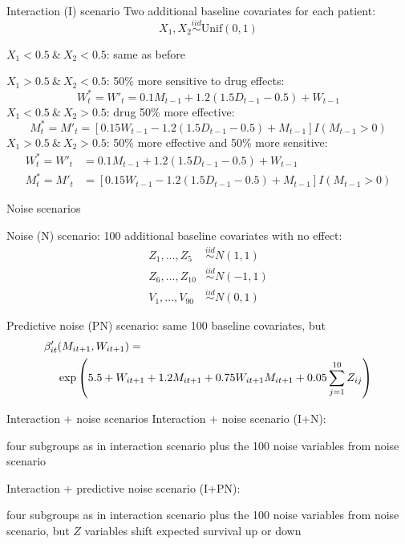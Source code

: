 \documentclass[handout]{beamer}
\begin{document}
\begin{frame}[c]{Interaction (I) scenario}
  Two additional baseline covariates for each patient:
  \begin{equation*}
    X_{1}, X_{2} \overset{iid}{\sim} \text{Unif}(0, 1)
  \end{equation*}
  
  $X_{1} < 0.5 \ \& \ X_{2} < 0.5$: same as before
  
  
  $X_{1} > 0.5 \ \& \ X_{2} < 0.5$: 50\% more sensitive to drug effects:
  \begin{equation*}
  W^{*}_{t} = W'_{t} = 0.1 M_{t-1} + 1.2 (1.5 D_{t-1} - 0.5) + W_{t - 1}
  \end{equation*}
  $X_{1} < 0.5 \ \& \ X_{2} > 0.5$: drug 50\% more effective:
  \begin{equation*}
  M^{*}_{t} =  M'_{t} = [0.15 W_{t-1} - 1.2 (1.5 D_{t-1} - 0.5) + M_{t - 1}] I(M_{t-1} > 0)
  \end{equation*}
  $X_{1} > 0.5 \ \& \ X_{2} > 0.5$: 50\% more effective and 50\% more sensitive:
  \begin{align*}
  W^{*}_{t} = W'_{t} &= 0.1 M_{t-1} + 1.2 (1.5 D_{t-1} - 0.5) + W_{t - 1} \\
  M^{*}_{t} = M'_{t} &= [0.15 W_{t-1} - 1.2 (1.5 D_{t-1} - 0.5) + M_{t - 1}] I(M_{t-1} > 0)
  \end{align*}
\end{frame}

\begin{frame}[c]{Noise scenarios}
  
  Noise (N) scenario: 100 additional baseline covariates with no effect:
  \begin{align*}
    Z_{1}, \ldots, Z_{5} &\overset{iid}{\sim} N(1, 1) \\
    Z_{6}, \ldots, Z_{10} &\overset{iid}{\sim} N(-1, 1) \\
    V_{1}, \ldots, V_{90} &\overset{iid}{\sim} N(0, 1)
  \end{align*}
  
  Predictive noise (PN) scenario: same 100 baseline covariates, but
  \begin{align*}
    \beta'_{it}&(M_{it+1}, W_{it+1}) = \\
    &\exp\del{5.5 + W_{it+1} + 1.2 M_{it+1} + 0.75 W_{it+1} M_{it+1} + 0.05 \sum_{j = 1}^{10} Z_{ij}}
  \end{align*}
\end{frame}

\begin{frame}[c]{Interaction + noise scenarios}
  Interaction + noise scenario (I+N):
  
  four subgroups as in interaction scenario plus the 100 noise variables from noise scenario
  
  \bigskip
  
  Interaction + predictive noise scenario (I+PN):
  
  four subgroups as in interaction scenario plus the 100 noise variables from noise scenario, but $Z$ variables shift expected survival up or down
\end{frame}
\end{document}
